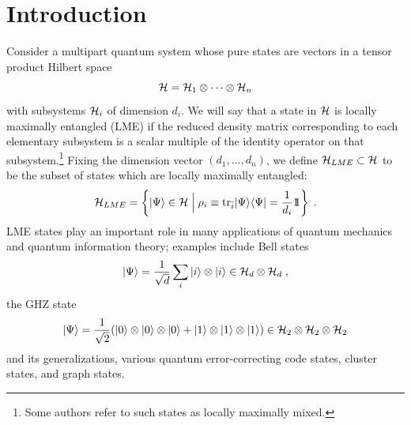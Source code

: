 \documentclass[12pt]{article}
\theoremstyle{definition}
\newcommand{\be}{\begin{equation}}
\newcommand{\ee}{\end{equation}}
\def\identity{{\rlap{1} \hskip 1.6pt \hbox{1}}}
\newcommand{\tr}{{\rm tr}}
\begin{document}
\begin{titlepage}
\begin{abstract}

\end{abstract}

\end{titlepage}
\tableofcontents

\section{Introduction}

Consider a multipart quantum system whose pure states are vectors in a tensor product Hilbert space
\[
{\cal H} = {\cal H}_{1}  \otimes \cdots  \otimes {\cal H}_{n}
\]
with subsystems ${\cal H}_i$ of dimension $d_i$. We will say that a state in ${\cal H}$ is locally maximally entangled (LME) if the reduced density matrix corresponding to each elementary subsystem is a scalar multiple of the identity operator on that subsystem.\footnote{Some authors refer to such states as locally maximally mixed.}
Fixing the dimension vector $(d_1,\dots,d_n)$, we define ${\cal H}_{LME} \subset {\cal H}$ to be the subset of states which are locally maximally entangled:
\be
{\cal H}_{LME} = \left\{|\Psi \rangle \in {\cal H} \; \Big| \; \rho_i \equiv \tr_{\bar{i}}|\Psi \rangle \langle \Psi | = \frac{1}{d_i} \identity \right\}\; .
\ee
LME states play an important role in many applications of quantum mechanics and quantum information theory; examples include Bell states
\be
\label{Bell}
|\Psi \rangle = \frac{1}{\sqrt{d}} \sum_{i} |i \rangle  \otimes |i \rangle \in {\cal H}_d  \otimes {\cal H}_d \; ,
\ee
the GHZ state
\be
\label{GHZ}
|\Psi \rangle = \frac{1}{\sqrt{2}} (|0 \rangle  \otimes |0 \rangle  \otimes |0 \rangle  + |1 \rangle  \otimes |1 \rangle  \otimes |1 \rangle) \in {\cal H}_2  \otimes {\cal H}_2  \otimes {\cal H}_2
\ee
and its generalizations, various quantum error-correcting code states, cluster states, and graph states.
\end{document}

